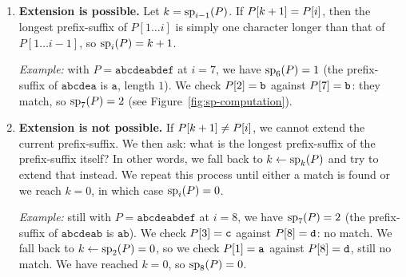 \begin{enumerate}
  \item \textbf{Extension is possible.} Let $k = \mathrm{sp}_{i-1}(P)$. If $P[k+1] = P\kern0pt[i]$,
        then the longest prefix-suffix of $P[1\ldots i]$ is simply one character longer
        than that of $P[1\ldots i-1]$, so $\mathrm{sp}_{i}(P) = k + 1$.

        \textit{Example:} with $P = \texttt{abcdeabdef}$ at $i=7$, we have $\mathrm{sp}_{6}(P)=1$
        (the prefix-suffix of $\texttt{abcdea}$ is $\texttt{a}$, length $1$). We check
        $P\kern0pt[2] = \texttt{b}$ against $P\kern0pt[7] = \texttt{b}$: they match, so $\mathrm{sp}_{7}(P) = 2$
        (see Figure~\ref{fig:sp-computation}).

  \item \textbf{Extension is not possible.} If $P[k+1] \neq P\kern0pt[i]$, we cannot
        extend the current prefix-suffix. We then ask: what is the longest
        prefix-suffix of the prefix-suffix itself? In other words, we fall back to
        $k \gets \mathrm{sp}_{k}(P)$ and try to extend that instead. We repeat this process
        until either a match is found or we reach $k = 0$, in which case $\mathrm{sp}_{i}(P) = 0$.

        \textit{Example:} still with $P = \texttt{abcdeabdef}$ at $i=8$, we have
        $\mathrm{sp}_{7}(P)=2$ (the prefix-suffix of $\texttt{abcdeab}$ is $\texttt{ab}$). We check
        $P\kern0pt[3] = \texttt{c}$ against $P\kern0pt[8] = \texttt{d}$: no match. We fall back to
        $k \gets \mathrm{sp}_{2}(P) = 0$, so we check $P\kern0pt[1] = \texttt{a}$ against $P\kern0pt[8] = \texttt{d}$,
        still no match. We have reached $k = 0$, so $\mathrm{sp}_{8}(P) = 0$.
\end{enumerate}


